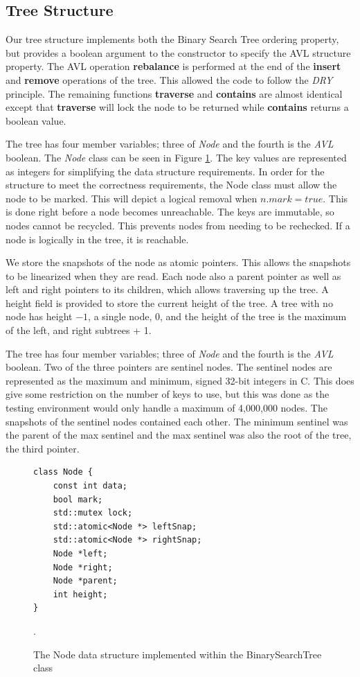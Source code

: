 \documentclass[conference]{IEEEtran}
\theoremstyle{definition}
\theoremstyle{theorem}
\begin{document}
\subsection{Tree Structure}
Our tree structure implements both the Binary Search Tree ordering property, but provides a boolean argument to the constructor to specify the AVL structure property. The AVL operation \textbf{rebalance} is performed at the end of the \textbf{insert} and \textbf{remove} operations of the tree. This allowed the code to follow the \textit{DRY} principle. The remaining functions \textbf{traverse} and \textbf{contains} are almost identical except that \textbf{traverse} will lock the node to be returned while \textbf{contains} returns a boolean value.

The tree has four member variables; three of \textit{Node} and the fourth is the \textit{AVL} boolean. The \textit{Node} class can be seen in Figure \ref{fig:node}. The key values are represented as integers for simplifying the data structure requirements. In order for the structure to meet the correctness requirements, the Node class must allow the node to be marked. This will depict a logical removal when $n.mark = true$. This is done right before a node becomes unreachable. The keys are immutable, so nodes cannot be recycled. This prevents nodes from needing to be rechecked. If a node is logically in the tree, it is reachable. 

We store the snapshots of the node as atomic pointers. This allows the snapshots to be linearized when they are read. Each node also a parent pointer as well as left and right pointers to its children, which allows traversing up the tree. A height field is provided to store the current height of the tree. A tree with no node has height $-1$, a single node, 0, and the height of the tree is the maximum of the left, and right subtrees + 1.

The tree has four member variables; three of \textit{Node} and the fourth is the \textit{AVL} boolean. Two of the three pointers are sentinel nodes. The sentinel nodes are represented as the maximum and minimum, signed 32-bit integers in C. This does give some restriction on the number of keys to use, but this was done as the testing environment would only handle a maximum of 4,000,000 nodes. The snapshots of the sentinel nodes contained each other. The minimum sentinel was the parent of the max sentinel and the max sentinel was also the root of the tree, the third pointer.
\begin{figure}[t]
\centering
\begin{lstlisting}
class Node {
	const int data;
	bool mark;
	std::mutex lock;
	std::atomic<Node *> leftSnap;
	std::atomic<Node *> rightSnap;
	Node *left;
	Node *right;
	Node *parent;
	int height;
}
\end{lstlisting}
\caption{The Node data structure implemented within the BinarySearchTree class}.
\label{fig:node}
\end{figure}
\end{document}
